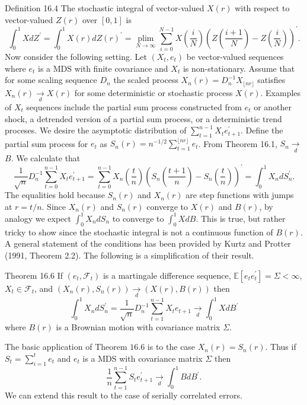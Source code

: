 \documentclass[10pt]{article}
\begin{document}
Definition 16.4 The stochastic integral of vector-valued $X(r)$ with respect to vector-valued $Z(r)$ over $[0,1]$ is
$$
\int_{0}^{1} X d Z^{\prime}=\int_{0}^{1} X(r) d Z(r)^{\prime}=\underset{N \rightarrow \infty}{\operatorname{plim}} \sum_{i=0}^{N-1} X\left(\frac{i}{N}\right)\left(Z\left(\frac{i+1}{N}\right)-Z\left(\frac{i}{N}\right)\right)^{\prime} .
$$
Now consider the following setting. Let $\left(X_{t}, e_{t}\right)$ be vector-valued sequences where $e_{t}$ is a MDS with finite covariance and $X_{t}$ is non-stationary. Assume that for some scaling sequence $D_{n}$ the scaled process $X_{n}(r)=D_{n}^{-1} X_{\lfloor n r\rfloor}$ satisfies $X_{n}(r) \underset{d}{\longrightarrow} X(r)$ for some deterministic or stochastic process $X(r)$. Examples of $X_{t}$ sequences include the partial sum process constructed from $e_{t}$ or another shock, a detrended version of a partial sum process, or a deterministic trend proceses. We desire the asymptotic distribution of $\sum_{t=1}^{n-1} X_{t} e_{t+1}^{\prime}$. Define the partial sum process for $e_{t}$ as $S_{n}(r)=n^{-1 / 2} \sum_{t=1}^{\lfloor n r\rfloor} e_{t}$. From Theorem 16.1, $S_{n} \underset{d}{\longrightarrow}$ $B$. We calculate that
$$
\frac{1}{\sqrt{n}} D_{n}^{-1} \sum_{t=0}^{n-1} X_{t} e_{t+1}^{\prime}=\sum_{t=0}^{n-1} X_{n}\left(\frac{t}{n}\right)\left(S_{n}\left(\frac{t+1}{n}\right)-S_{n}\left(\frac{t}{n}\right)\right)^{\prime}=\int_{0}^{1} X_{n} d S_{n}^{\prime} .
$$
The equalities hold because $S_{n}(r)$ and $X_{n}(r)$ are step functions with jumps at $r=t / n$. Since $X_{n}(r)$ and $S_{n}(r)$ converge to $X(r)$ and $B(r)$, by analogy we expect $\int_{0}^{1} X_{n} d S_{n}$ to converge to $\int_{0}^{1} X d B$. This is true, but rather tricky to show since the stochastic integral is not a continuous function of $B(r)$. A general statement of the conditions has been provided by Kurtz and Protter (1991, Theorem 2.2). The following is a simplification of their result.

Theorem 16.6 If $\left(e_{t}, \mathscr{F}_{t}\right)$ is a martingale difference sequence, $\mathbb{E}\left[e_{t} e_{t}^{\prime}\right]=\Sigma<\infty$, $X_{t} \in \mathscr{F}_{t}$, and $\left(X_{n}(r), S_{n}(r)\right) \underset{d}{\longrightarrow}(X(r), B(r))$ then
$$
\int_{0}^{1} X_{n} d S_{n}^{\prime}=\frac{1}{\sqrt{n}} D_{n}^{-1} \sum_{t=1}^{n-1} X_{t} e_{t+1} \underset{d}{\longrightarrow} \int_{0}^{1} X d B^{\prime}
$$
where $B(r)$ is a Brownian motion with covariance matrix $\Sigma$.

The basic application of Theorem $16.6$ is to the case $X_{n}(r)=S_{n}(r)$. Thus if $S_{t}=\sum_{i=1}^{t} e_{t}$ and $e_{t}$ is a MDS with covariance matrix $\Sigma$ then
$$
\frac{1}{n} \sum_{t=1}^{n-1} S_{t} e_{t+1}^{\prime} \underset{d}{\longrightarrow} \int_{0}^{1} B d B^{\prime} .
$$
We can extend this result to the case of serially correlated errors.
\end{document}
